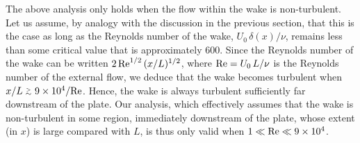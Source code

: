 The above analysis only holds when the flow within the wake is non-turbulent. Let us assume, by analogy with the
discussion in the previous section, that
this is the case as long as the Reynolds number of the wake, $U_0\,\delta(x)/\nu$,  remains less than some
critical value that is approximately $600$.
Since the Reynolds number of the wake can be written $2\,{\rm Re}^{1/2}\,(x/L)^{1/2}$,
where ${\rm Re}=U_0\,L/\nu$ is the Reynolds number of the external flow, we deduce that the wake becomes turbulent
when $x/L \stackrel {_{\normalsize>}}{_{\normalsize \sim}} 9\times 10^4/{\rm Re}$. Hence, the wake is always turbulent sufficiently far downstream of the plate.
Our analysis, which effectively assumes that the wake is  non-turbulent in some region, immediately downstream of the plate, whose extent (in $x$) is large compared
with $L$, is thus only valid when $1\ll {\rm Re}\ll 9\times 10^4$. 

